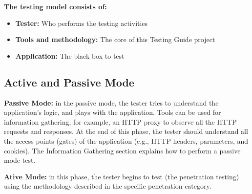 		{\bf The testing model consists of:}
			\begin{itemize}
				\item {\bf Tester:} Who performs the testing activities
				\item {\bf Tools and methodology:} The core of this Testing Guide project
				\item {\bf Application:} The black box to test
			\end{itemize}

	\subsection*{Active and Passive Mode}

		{\bf Passive Mode:} in the passive mode, the tester tries to understand the application's logic, 
		and plays with the application. Tools can be used for information gathering, for example, an 
		HTTP proxy to observe all the HTTP requests and responses. At the end of this phase, the tester 
		should understand all the access points (gates) of the application (e.g., HTTP headers, parameters,
		and cookies). The Information Gathering section explains how to perform a passive mode test.

		{\bf Ative Mode:}  in this phase, the tester begins to test (the penetration testing) using 
		the methodology described in the specific penetration category.
